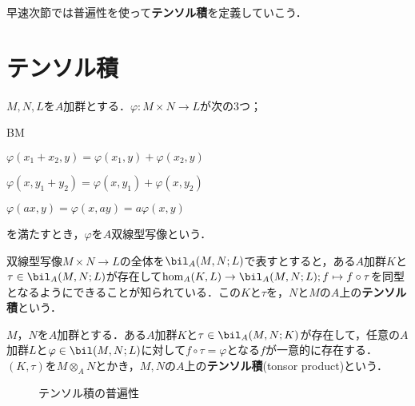 早速次節では普遍性を使って\textbf{テンソル積}を定義していこう．

\section{テンソル積}

\begin{defi}[双線型写像]
	$M,N,L$を$A$加群とする．$\varphi:M\times N\to L$が次の3つ；
	\begin{defiterm}{BM}
		\item $\varphi(x_1+x_2,y)=\varphi(x_1,y)+\varphi(x_2,y)$
		\item $\varphi(x,y_1+y_2)=\varphi(x,y_1)+\varphi(x,y_2)$
		\item $\varphi(ax,y)=\varphi(x,ay)=a\varphi(x,y)$
	\end{defiterm}
	を満たすとき，$\varphi$を$A$双線型写像という．
\end{defi}

双線型写像$M\times N\to L$の全体を$\bil_A(M,N;L)$で表すとすると，ある$A$加群$K$と$\tau\in\bil_A(M,N;L)$が存在して$\hom_A(K,L)\to\bil_A(M,N;L);f\mapsto f\circ\tau$を同型となるようにできることが知られている．この$K$と$\tau$を，$N$と$M$の$A$上の\textbf{テンソル積}という．

\begin{defi}[テンソル積]
	$M，N$を$A$加群とする．ある$A$加群$K$と$\tau\in\bil_A(M,N;K)$が存在して，任意の$A$加群$L$と$\varphi\in\bil(M,N;L)$に対して$f\circ\tau=\varphi$となる$f$が一意的に存在する．$(K,\tau)$を$M\otimes_A N$とかき，$M,N$の$A$上の\textbf{テンソル積}(tonsor product)という．
\end{defi}

\begin{figure}[H]
	\centering
	\caption{テンソル積の普遍性}
\end{figure}


